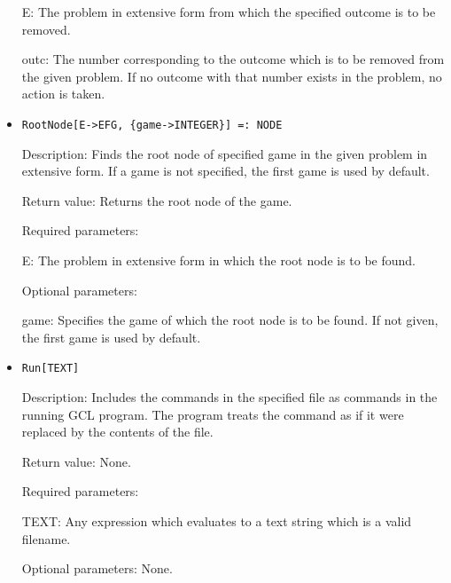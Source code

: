 \begin{itemize}
\bd
\item
[ E:] The problem in extensive form from which the specified outcome
is to be removed.
\item
[ outc:] The number corresponding to the outcome which is to be 
removed from the given problem.  If no outcome with that number
exists in the problem, no action is taken.
\ed
\ed

\item
\protect \large \begin{verbatim}
RootNode[E->EFG, {game->INTEGER}] =: NODE
\end{verbatim}\normalsize

\bd
\item
[Description:] Finds the root node of specified game in the given 
problem in extensive form.  If a game is not specified, the first game 
is used by default.
\item
[Return value:] Returns the root node of the game.
\item
[Required parameters:]\hfil\null
	
\bd
\item
[ E:] The problem in extensive form in which the root node is to be
found.
\ed

\item
[Optional parameters:]\hfil\null

\bd
\item
[ game:] Specifies the game of which the root node is to be found.
If not given, the first game is used by default.
\ed
\ed

\item

\protect \large \begin{verbatim}
Run[TEXT]
\end{verbatim}\normalsize

\bd
\item
[Description:] Includes the commands in the specified file as commands 
in the running GCL program.  The program treats the command as if it 
were replaced by the contents of the file.
\item
[Return value:] None.
\item
[Required parameters:]\hfil\null
	
\bd
\item
[ TEXT:] Any expression which evaluates to a text string which is a
valid filename.
\ed

\item
[Optional parameters:] None.
\ed


\end{itemize}
